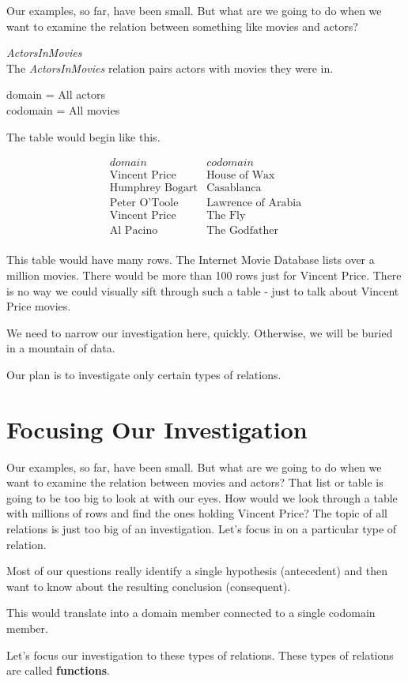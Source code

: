 \documentclass{ximera}
\begin{document}
Our examples, so far, have been small.  But what are we going to do when we want to examine the relation between something like movies and actors?  


\begin{example} \textit{ActorsInMovies} \\
The \textit{ActorsInMovies} relation pairs actors with movies they were in.

domain = All actors \\
codomain = All movies

The table would begin like this.

\[
\begin{array}{l|l}
    domain      & codomain      \\ \hline
    \text{Vincent Price}   &  \text{House of Wax} \\
    \text{Humphrey Bogart}   & \text{Casablanca} \\
    \text{Peter O'Toole}  &  \text{Lawrence of Arabia} \\
    \text{Vincent Price}  &  \text{The Fly} \\
    \text{Al Pacino} &  \text{The Godfather} \\ 
\end{array}
\]

\end{example} 


This table would have many rows. The Internet Movie Database lists over a million movies.  There would be more than 100 rows just for Vincent Price. There is no way we could visually sift through such a table - just to talk about Vincent Price movies.

We need to narrow our investigation here, quickly. Otherwise, we will be buried in a mountain of data.

Our plan is to investigate only certain types of relations.








\section{Focusing Our Investigation}


Our examples, so far, have been small.  But what are we going to do when we want to examine the relation between movies and actors?  That list or table is going to be too big to look at with our eyes.  How would we look through a table with millions of rows and find the ones holding Vincent Price?  The topic of all relations is just too big of an investigation. Let's focus in on a particular type of relation.

Most of our questions really identify a single hypothesis (antecedent) and then want to know about the resulting conclusion (consequent).

This would translate into a domain member connected to a single codomain member.

Let's focus our investigation to these types of relations.  These types of relations are called \textbf{functions}.
\end{document}
